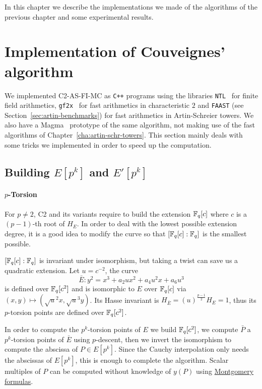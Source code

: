 In this chapter we describe the implementations we made of the
algorithms of the previous chapter and some experimental results.

\section{Implementation of Couveignes' algorithm}
\label{sec:implementation}

We implemented C2-AS-FI-MC as \texttt{C++} programs using the
libraries \texttt{NTL}~\cite{shoup2003ntl} for finite field
arithmetics, \texttt{gf2x}~\cite{gf2x} for fast arithmetics in
characteristic $2$ and \texttt{FAAST} (see
Section~\ref{sec:artin-benchmarks}) for fast arithmetics in
Artin-Schreier towers.  We also have a Magma~\cite{MAGMA} prototype of
the same algorithm, not making use of the fast algorithms of
Chapter~\ref{cha:artin-schr-towers}.  This section mainly deals with
some tricks we implemented in order to speed up the computation.

\subsection{Building \texorpdfstring{$E[p^k]$}{E[pk]} and \texorpdfstring{$E'[p^k]$}{E[pk]}}
\label{sec:impl:torsion}

\paragraph{$p$-Torsion}
For $p\ne2$, C2 and its variants require to build the extension
$\mathbb{F}_q[c]$ where $c$ is a $(p-1)$-th root of $H_E$. In order to deal with
the lowest possible extension degree, it is a good idea to modify the
curve so that $[\mathbb{F}_q[c]:\mathbb{F}_q]$ is the smallest possible.

$[\mathbb{F}_q[c]:\mathbb{F}_q]$ is invariant under isomorphism, but taking a twist
can save us a quadratic extension. Let $u=c^{-2}$, the curve
\begin{equation*}
  \bar{E} : y^2 = x^3 + a_2ux^2 + a_4u^2x + a_6u^3
\end{equation*}
is defined over $\mathbb{F}_q[c^2]$ and is isomorphic to $E$ over $\mathbb{F}_q[c]$
via $(x,y)\mapsto(\sqrt{u}^2x,\sqrt{u}^3y)$. Its Hasse invariant is
$H_{\bar{E}} = (u)^{\frac{p-1}{2}}H_E = 1$, thus its $p$-torsion
points are defined over $\mathbb{F}_q[c^2]$.

In order to compute the $p^k$-torsion points of $E$ we build
$\mathbb{F}_q[c^2]$, we compute $\bar{P}$ a $p^k$-torsion points of $\bar{E}$
using $p$-descent, then we invert the isomorphism to compute the
abscissa of $P\in E[p^k]$. Since the Cauchy interpolation only needs
the abscissas of $E[p^k]$, this is enough to complete the
algorithm. Scalar multiples of $P$ can be computed without knowledge
of $y(P)$ using \hyperref[rk:montgomery]{Montgomery formulas}.


